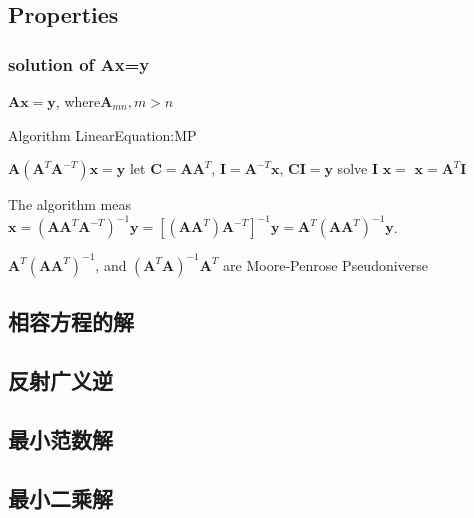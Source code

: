 \documentclass[UTF8]{../../09-Mathematics}
\begin{document}
\subsection{Properties}

\subsubsection{solution of Ax=y}
$\boldsymbol A \boldsymbol x = \boldsymbol y$, where$\boldsymbol A_{mn},m>n$


\begin{algorithm}[H]
    \caption{Algorithm LinearEquation:MP}\label{algo:LinearEquation:MP}
    \SetAlgoLined
    $\boldsymbol A (\boldsymbol A^T \boldsymbol A^{-T}) \boldsymbol x = \boldsymbol y$\;
    let $\boldsymbol C = \boldsymbol A \boldsymbol A^T$, $\boldsymbol I = \boldsymbol A^{-T} \boldsymbol x$, $\boldsymbol C \boldsymbol I = \boldsymbol y$\;
    solve $\boldsymbol I$\;
    $\boldsymbol x = $\;
    \KwRet $\boldsymbol x = \boldsymbol A^T \boldsymbol I$\;
\end{algorithm}

The algorithm meas $\boldsymbol x = (\boldsymbol A \boldsymbol A^T \boldsymbol A^{-T})^{-1} \boldsymbol y = [(\boldsymbol A \boldsymbol A^T )\boldsymbol A^{-T}]^{-1} \boldsymbol y = \boldsymbol A^T (\boldsymbol A \boldsymbol A^T )^{-1} \boldsymbol y$.

$\boldsymbol A^T (\boldsymbol A \boldsymbol A^T )^{-1}$, and $(\boldsymbol A^T \boldsymbol A )^{-1}\boldsymbol A^T$ are Moore-Penrose Pseudoniverse


\subsection{相容方程的解}
\subsection{反射广义逆}
\subsection{最小范数解}
\subsection{最小二乘解}
\end{document}
